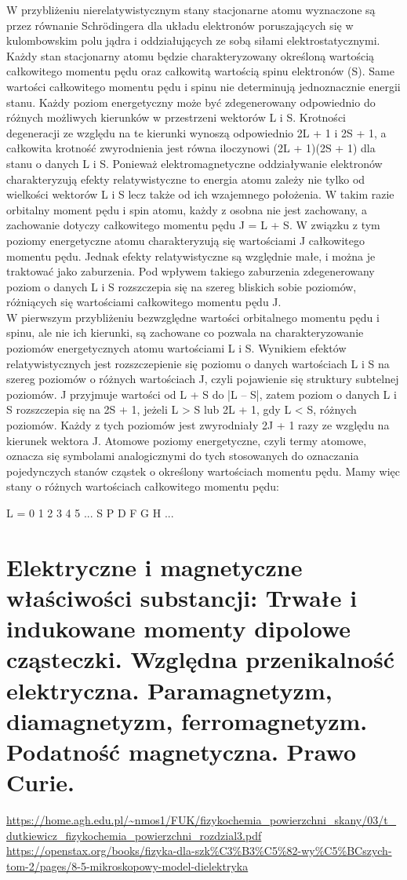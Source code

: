 \documentclass{article}
\begin{document}
W przybliżeniu nierelatywistycznym stany stacjonarne atomu wyznaczone są przez równanie Schrödingera dla układu elektronów poruszających się w kulombowskim polu jądra i oddziałujących ze sobą siłami elektrostatycznymi. Każdy stan stacjonarny atomu będzie charakteryzowany określoną wartością całkowitego momentu pędu oraz całkowitą wartością spinu elektronów (S). Same wartości całkowitego momentu pędu i spinu nie determinują jednoznacznie energii stanu. Każdy poziom energetyczny może być zdegenerowany odpowiednio do różnych możliwych kierunków w przestrzeni wektorów L i S. Krotności degeneracji ze względu na te kierunki wynoszą odpowiednio 2L + 1 i 2S + 1, a całkowita krotność zwyrodnienia jest równa iloczynowi (2L + 1)(2S + 1) dla stanu o danych L i S. Ponieważ elektromagnetyczne oddziaływanie elektronów charakteryzują efekty relatywistyczne to energia atomu zależy nie tylko od wielkości wektorów L i S lecz także od ich wzajemnego położenia. W takim razie orbitalny moment pędu i spin atomu, każdy z osobna nie jest zachowany, a zachowanie dotyczy całkowitego momentu pędu J = L + S. W związku z tym poziomy energetyczne atomu charakteryzują się wartościami J całkowitego momentu pędu. Jednak efekty relatywistyczne są względnie małe, i można je traktować jako zaburzenia. Pod wpływem takiego zaburzenia zdegenerowany poziom o danych L i S rozszczepia się na szereg bliskich sobie poziomów, różniących się wartościami całkowitego momentu pędu J. \\

W pierwszym przybliżeniu bezwzględne wartości orbitalnego momentu pędu i spinu, ale nie ich kierunki, są zachowane co pozwala na charakteryzowanie poziomów energetycznych atomu wartościami L i S. Wynikiem efektów relatywistycznych jest rozszczepienie się poziomu o danych wartościach L i S na szereg poziomów o różnych wartościach J, czyli pojawienie się struktury subtelnej poziomów. J przyjmuje wartości od L + S do |L – S|, zatem poziom o danych L i S rozszczepia się na 2S + 1, jeżeli L > S lub 2L + 1, gdy L < S, różnych poziomów. Każdy z tych poziomów jest zwyrodniały 2J + 1 razy ze względu na kierunek wektora J.
Atomowe poziomy energetyczne, czyli termy atomowe, oznacza się symbolami analogicznymi do tych stosowanych do oznaczania pojedynczych stanów cząstek o określony wartościach momentu pędu. Mamy więc stany o różnych wartościach całkowitego momentu pędu:

L	=	0	1	2	3	4	5	...
 	 	S	P	D	F	G	H	...

\section{Elektryczne i magnetyczne właściwości substancji: Trwałe i indukowane momenty dipolowe cząsteczki. Względna przenikalność elektryczna. Paramagnetyzm, diamagnetyzm, ferromagnetyzm. Podatność magnetyczna. Prawo Curie.}
\url{https://home.agh.edu.pl/~nmos1/FUK/fizykochemia_powierzchni_skany/03/t_dutkiewicz_fizykochemia_powierzchni_rozdzial3.pdf}\\
\url{https://openstax.org/books/fizyka-dla-szk%C3%B3%C5%82-wy%C5%BCszych-tom-2/pages/8-5-mikroskopowy-model-dielektryka}
\end{document}
